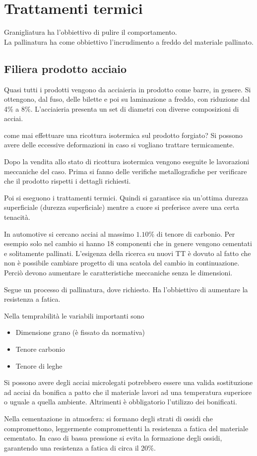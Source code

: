 \chapter{Trattamenti termici}
Granigliatura ha l'obbiettivo di pulire il comportamento.\\
La pallinatura ha come obbiettivo l'incrudimento a freddo del materiale pallinato.

\section{Filiera prodotto acciaio}
Quasi tutti i prodotti vengono da acciaieria in prodotto come barre, in genere. Si ottengono, dal fuso, delle bilette e poi su laminazione a freddo, con riduzione dal 4\% a 8\%.
L'acciaieria presenta un set di diametri con diverse composizioni di acciai.

come mai effettuare una ricottura isotermica sul prodotto forgiato?
Si possono avere delle eccessive deformazioni in caso si vogliano trattare termicamente.

Dopo la vendita allo stato di ricottura isotermica vengono eseguite le lavorazioni meccaniche del caso.
Prima si fanno delle verifiche metallografiche per verificare che il prodotto rispetti i dettagli richiesti.

Poi si eseguono i trattamenti termici.
Quindi si garantisce sia un'ottima durezza superficiale (durezza superficiale) mentre a cuore si preferisce avere una certa tenacità.

In automotive si cercano acciai al massimo $1.10\%$ di tenore di carbonio.
Per esempio solo nel cambio si hanno 18 componenti che in genere vengono cementati e solitamente pallinati.
L'esigenza della ricerca su nuovi \ac{TT} è dovuto al fatto che non è possibile cambiare progetto di una scatola del cambio in continuazione.
Perciò devono aumentare le caratteristiche meccaniche senza le dimensioni.

Segue un processo di pallinatura, dove richiesto.
Ha l'obbiettivo di aumentare la resistenza a fatica.

Nella temprabilità le variabili importanti sono
\begin{itemize}
\item Dimensione grano (è fissato da normativa)
\item Tenore carbonio
\item Tenore di leghe
\end{itemize}

Si possono avere degli acciai microlegati potrebbero essere una valida sostituzione ad acciai da bonifica a patto che il materiale lavori ad una temperatura superiore o uguale a quella ambiente. Altrimenti è obbligatorio l'utilizzo dei bonificati.

Nella cementazione in atmosfera: si formano degli strati di ossidi che compromettono, leggermente compromettenti la resistenza a fatica del materiale cementato.
In caso di bassa pressione si evita la formazione degli ossidi, garantendo una resistenza a fatica di circa il 20\%.
